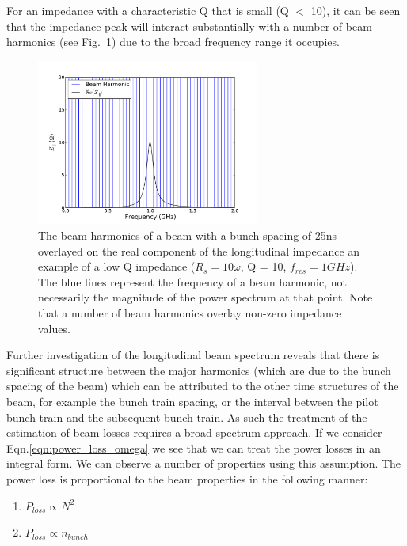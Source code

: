 For an impedance with a characteristic Q that is small (Q $<$ 10), it can be seen that the impedance peak will interact substantially with a number of beam harmonics (see Fig.~\ref{fig:low_q_harmonics}) due to the broad frequency range it occupies.

\begin{figure}
\begin{center}
\includegraphics[width=0.65\textwidth]{Wakefields_and_Impedances/figures/low_q_10_resonance_beam_harmonics.pdf}
\end{center}
\label{fig:low_q_harmonics}
\caption{The beam harmonics of a beam with a bunch spacing of 25ns overlayed on the real component of the longitudinal impedance an example of a low Q impedance ($R_{s}=10\omega$, Q = 10, $f_{res}=1GHz$). The blue lines represent the frequency of a beam harmonic, not necessarily the magnitude of the power spectrum at that point. Note that a number of beam harmonics overlay non-zero impedance values.}
\end{figure}

Further investigation of the longitudinal beam spectrum reveals that there is significant structure between the major harmonics (which are due to the bunch spacing of the beam) which can be attributed to the other time structures of the beam, for example the bunch train spacing, or the interval between the pilot bunch train and the subsequent bunch train. As such the treatment of the estimation of beam losses requires a broad spectrum approach. If we consider Eqn.\ref{eqn:power_loss_omega} we see that we can treat the power losses in an integral form. We can observe a number of properties using this assumption. The power loss is proportional to the beam properties in the following manner:

\begin{enumerate}
\item{$P_{loss} \propto N^{2}$}
\item{$P_{loss} \propto n_{bunch}$}
\end{enumerate}

